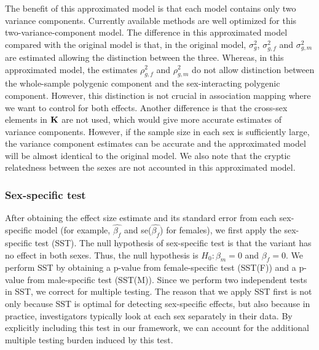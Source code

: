 \documentclass[11pt]{article}
\begin{document}
The benefit of this approximated model is that each model contains only two variance components.
Currently available methods are well optimized for this two-variance-component model. 
\citep{Zhou:NatGenet:2012,Kang2010,Kang:2008bx}
The difference in this approximated model compared with the original model
is that, in the original model, $\sigma^2_g$, $\sigma^2_{g,f}$ and $\sigma^2_{g,m}$ are estimated allowing the distinction between the three.
Whereas, in this approximated model, the estimates $\rho^2_{g,f}$ and $\rho^2_{g,m}$ do not allow distinction between the whole-sample polygenic component
and the sex-interacting polygenic component. 
However, this distinction is not crucial in association mapping where we want to control for both effects. 
Another difference is that the cross-sex elements in $\bf{K}$ are not used, which would give more accurate estimates of variance components.
However, if the sample size in each sex is sufficiently large, the variance component estimates can be accurate and
the approximated model will be almost identical to the original model.
We also note that the cryptic relatedness between the sexes are not accounted in this approximated model.

\subsubsection*{Sex-specific test}
After obtaining the effect size estimate and its standard error from each sex-specific model 
(for example, $\hat{\beta_f}$ and se($\hat{\beta_f}$) for females), %
we first apply the sex-specific test (SST). 
The null hypothesis of sex-specific test is that the variant has no effect in both sexes. Thus, the null hypothesis is $H_0: \beta_m=0$ and $\beta_f=0$. 
We perform SST by obtaining a p-value from female-specific test (SST(F)) and a p-value from male-specific test (SST(M)).
Since we perform two independent tests in SST, we correct for multiple testing. 
%
%
The reason that we apply SST first is 
not only because SST is optimal for detecting sex-specific effects, but also because in practice, 
investigators typically look at each sex separately in their data.
By explicitly including this test in our framework, we can account for the additional multiple testing burden induced by this test. 
\end{document}
